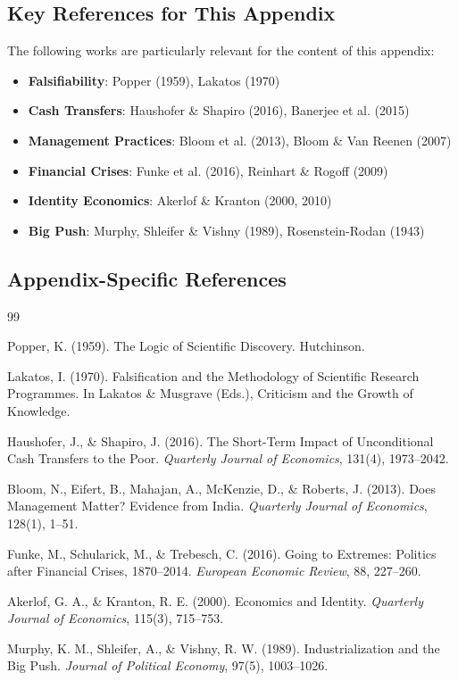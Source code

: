 \vspace{0.5em}

\subsection{Key References for This Appendix}

The following works are particularly relevant for the content of this appendix:

\begin{itemize}[nosep]
    \item \textbf{Falsifiability}: Popper (1959), Lakatos (1970)
    \item \textbf{Cash Transfers}: Haushofer \& Shapiro (2016), Banerjee et al. (2015)
    \item \textbf{Management Practices}: Bloom et al. (2013), Bloom \& Van Reenen (2007)
    \item \textbf{Financial Crises}: Funke et al. (2016), Reinhart \& Rogoff (2009)
    \item \textbf{Identity Economics}: Akerlof \& Kranton (2000, 2010)
    \item \textbf{Big Push}: Murphy, Shleifer \& Vishny (1989), Rosenstein-Rodan (1943)
\end{itemize}

\subsection{Appendix-Specific References}

\begin{thebibliography}{99}

 Popper, K. (1959). The Logic of Scientific Discovery. Hutchinson.

 Lakatos, I. (1970). Falsification and the Methodology of Scientific Research Programmes. In Lakatos \& Musgrave (Eds.), Criticism and the Growth of Knowledge.

 Haushofer, J., \& Shapiro, J. (2016). The Short-Term Impact of Unconditional Cash Transfers to the Poor. \textit{Quarterly Journal of Economics}, 131(4), 1973--2042.

 Bloom, N., Eifert, B., Mahajan, A., McKenzie, D., \& Roberts, J. (2013). Does Management Matter? Evidence from India. \textit{Quarterly Journal of Economics}, 128(1), 1--51.

 Funke, M., Schularick, M., \& Trebesch, C. (2016). Going to Extremes: Politics after Financial Crises, 1870--2014. \textit{European Economic Review}, 88, 227--260.

 Akerlof, G. A., \& Kranton, R. E. (2000). Economics and Identity. \textit{Quarterly Journal of Economics}, 115(3), 715--753.

 Murphy, K. M., Shleifer, A., \& Vishny, R. W. (1989). Industrialization and the Big Push. \textit{Journal of Political Economy}, 97(5), 1003--1026.

\end{thebibliography}


